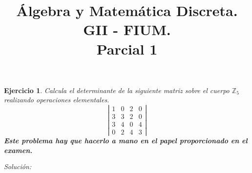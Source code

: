 \documentclass{amsart}
\title{Álgebra y Matemática Discreta. GII - FIUM. \\ Parcial 1}
\newtheorem{ejer}{Ejercicio}
\begin{document}
\maketitle


\begin{ejer} 
Calcula el determinante de la siguiente matriz sobre el cuerpo
${\mathbb Z}_5$ realizando operaciones elementales. 
$$ \left|\begin{array}{rrrr}
1 & 0 & 2 & 0 \\
3 & 3 & 2 & 0 \\
3 & 4 & 0 & 4 \\
0 & 2 & 4 & 3
\end{array}\right|$$
{\bf Este problema hay que hacerlo a mano en el papel proporcionado
en el examen.}
\end{ejer}

{\it Solución: }
\end{document}
